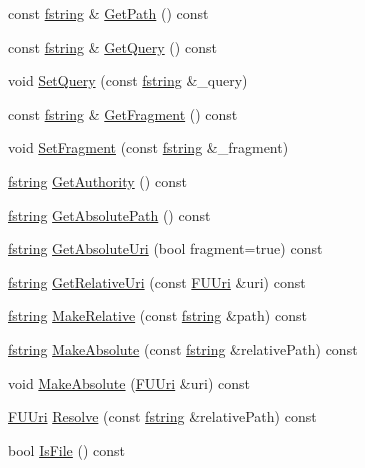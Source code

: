 \begin{DoxyCompactItemize}
\item 
const \hyperlink{classfm_1_1stringT}{fstring} \& \hyperlink{classFUUri_a8233de788d6cb56750e9f35048c7320b}{GetPath} () const 
\item 
const \hyperlink{classfm_1_1stringT}{fstring} \& \hyperlink{classFUUri_a71fdad0cd0aee8984524a01e2df4a035}{GetQuery} () const 
\item 
void \hyperlink{classFUUri_a41ee1669e5dfb1d8e3653435fd4fef7e}{SetQuery} (const \hyperlink{classfm_1_1stringT}{fstring} \&\_\-query)
\item 
const \hyperlink{classfm_1_1stringT}{fstring} \& \hyperlink{classFUUri_af7076dec33767dd3603e7931397538f6}{GetFragment} () const 
\item 
void \hyperlink{classFUUri_a2b0b0e750a39afbe023dbd6a50be800e}{SetFragment} (const \hyperlink{classfm_1_1stringT}{fstring} \&\_\-fragment)
\item 
\hyperlink{classfm_1_1stringT}{fstring} \hyperlink{classFUUri_a7c2582dfffd0fd24e276b08b0f73ad13}{GetAuthority} () const 
\item 
\hyperlink{classfm_1_1stringT}{fstring} \hyperlink{classFUUri_a38ed85e8f43c81df60ddddad24192dc6}{GetAbsolutePath} () const 
\item 
\hyperlink{classfm_1_1stringT}{fstring} \hyperlink{classFUUri_aceb87f906f4df9fe0647fc5f093b906c}{GetAbsoluteUri} (bool fragment=true) const 
\item 
\hyperlink{classfm_1_1stringT}{fstring} \hyperlink{classFUUri_a930987e39e4ccb7600b761e725278366}{GetRelativeUri} (const \hyperlink{classFUUri}{FUUri} \&uri) const 
\item 
\hyperlink{classfm_1_1stringT}{fstring} \hyperlink{classFUUri_a0965ba465497ba47e302b41c8c047433}{MakeRelative} (const \hyperlink{classfm_1_1stringT}{fstring} \&path) const 
\item 
\hyperlink{classfm_1_1stringT}{fstring} \hyperlink{classFUUri_abd09e7ad29661d295607856a881c25c4}{MakeAbsolute} (const \hyperlink{classfm_1_1stringT}{fstring} \&relativePath) const 
\item 
void \hyperlink{classFUUri_af88138c35ab87d0ce3f96da92c7cd16f}{MakeAbsolute} (\hyperlink{classFUUri}{FUUri} \&uri) const 
\item 
\hyperlink{classFUUri}{FUUri} \hyperlink{classFUUri_a898646ae3ff34140802d7f6c875903e1}{Resolve} (const \hyperlink{classfm_1_1stringT}{fstring} \&relativePath) const 
\item 
bool \hyperlink{classFUUri_abc200ea6b7718c4b6f8ff8a659a36bac}{IsFile} () const 
\end{DoxyCompactItemize}
